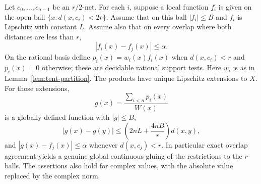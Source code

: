 \begin{theorem}
\label{thm:guarded-gluing}
Let $c_0,\ldots,c_{n-1}$ be an $r/2$-net.  For each $i$, suppose a
local function $f_i$ is given on the open ball
$\{x:d(x,c_i)<2r\}$.  Assume that on this ball $|f_i|\le B$ and
$f_i$ is Lipschitz with constant $L$.  Assume also that on every
overlap where both distances are less than $r$,
\[
 |f_i(x)-f_j(x)|\le\alpha.
\]
On the rational basis define $p_i(x)=w_i(x)f_i(x)$ when
$d(x,c_i)<r$ and $p_i(x)=0$ otherwise; these are decidable rational
support tests.  Here $w_i$ is as in Lemma~\ref{lem:tent-partition}.
The products have unique Lipschitz extensions to $X$.  For those
extensions,
\[
 g(x)=\frac{\sum_{i<n}p_i(x)}{W(x)}
\]
is a globally defined function with $|g|\le B$,
\begin{equation}\label{eq:gluing-lip}
 |g(x)-g(y)|\le
 \left(2nL+\frac{4nB}{r}\right)d(x,y),
\end{equation}
and $|g(x)-f_j(x)|\le\alpha$ whenever $d(x,c_j)<r$.
In particular exact overlap agreement yields a genuine global
continuous gluing of the restrictions to the $r$-balls.  The assertions
also hold for complex values, with
the absolute value replaced by the complex norm.
\end{theorem}

